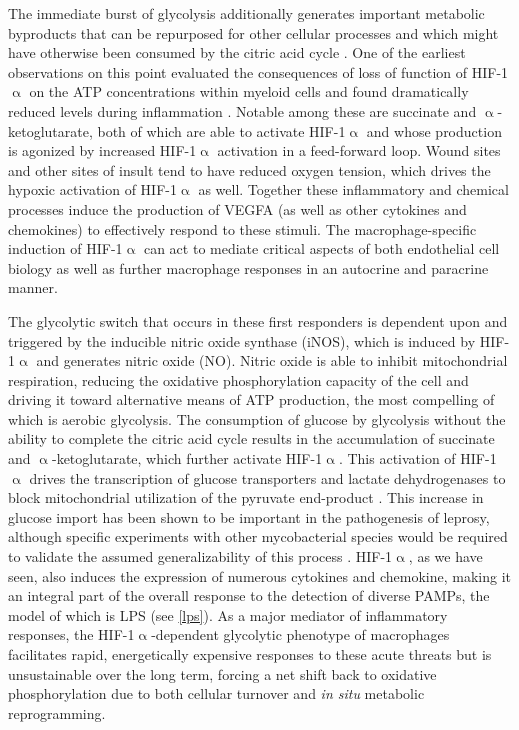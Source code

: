 The immediate burst of glycolysis additionally generates important metabolic byproducts that can be repurposed for other cellular processes and which might have otherwise been consumed by the citric acid cycle \citep{Viola2019, Kelly2015}. One of the earliest observations on this point evaluated the consequences of loss of function of HIF\hyp{}1$\upalpha$ on the ATP concentrations within myeloid cells and found dramatically reduced levels during inflammation \citep{Cramer2003}. Notable among these are succinate and $\upalpha$\hyp{}ketoglutarate, both of which are able to activate HIF\hyp{}1$\upalpha$ and whose production is agonized by increased HIF\hyp{}1$\upalpha$ activation in a feed\hyp{}forward loop. Wound sites and other sites of insult tend to have reduced oxygen tension, which drives the hypoxic activation of HIF\hyp{}1$\upalpha$ as well. Together these inflammatory and chemical processes induce the production of VEGFA (as well as other cytokines and chemokines) to effectively respond to these stimuli. The macrophage\hyp{}specific induction of HIF\hyp{}1$\upalpha$ can act to mediate critical aspects of both endothelial cell biology as well as further macrophage responses in an autocrine and paracrine manner.

The glycolytic switch that occurs in these first responders is dependent upon and triggered by the inducible nitric oxide synthase (iNOS), which is induced by HIF\hyp{}1$\upalpha$ and generates nitric oxide (NO). Nitric oxide is able to inhibit mitochondrial respiration, reducing the oxidative phosphorylation capacity of the cell and driving it toward alternative means of ATP production, the most compelling of which is aerobic glycolysis. The consumption of glucose by glycolysis without the ability to complete the citric acid cycle results in the accumulation of succinate and $\upalpha$\hyp{}ketoglutarate, which further activate HIF\hyp{}1$\upalpha$. This activation of HIF\hyp{}1$\upalpha$ drives the transcription of glucose transporters and lactate dehydrogenases to block mitochondrial utilization of the pyruvate end\hyp{}product \citep{Russell2019a, GalvanPena2014}. This increase in glucose import has been shown to be important in the pathogenesis of leprosy, although specific experiments with other mycobacterial species would be required to validate the assumed generalizability of this process \citep{Medeiros2016, MontoyaRosales2016, Vance2019}. HIF\hyp{}1$\upalpha$, as we have seen, also induces the expression of numerous cytokines and chemokine, making it an integral part of the overall response to the detection of diverse PAMPs, the model of which is LPS (see \autoref{lps}). As a major mediator of inflammatory responses, the HIF\hyp{}1$\upalpha$\hyp{}dependent glycolytic phenotype of macrophages facilitates rapid, energetically expensive responses to these acute threats but is unsustainable over the long term, forcing a net shift back to oxidative phosphorylation due to both cellular turnover and \textit{in situ} metabolic reprogramming.

